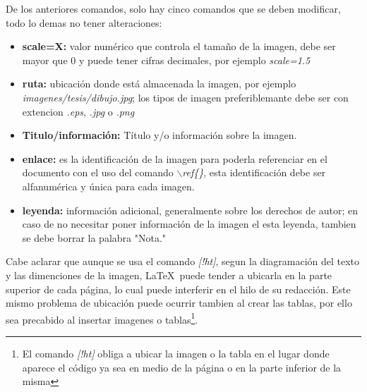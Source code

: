 De los anteriores comandos, solo hay cinco comandos que se deben modificar, todo lo demas no tener alteraciones:
\begin{itemize}
    \item \textbf{scale=X: } valor numérico que controla el tamaño de la imagen, debe ser mayor que 0 y puede tener cifras decimales, por ejemplo \emph{scale=1.5} 
    \item \textbf{ruta: } ubicación donde está almacenada la imagen, por ejemplo \emph{imagenes/tesis/dibujo.jpg}; los tipos de imagen preferiblemante debe ser con extencion \emph{.eps}, \emph{.jpg} o \emph{.png}
    \item \textbf{Titulo/información: } Título y/o información sobre la imagen.
    \item \textbf{enlace: } es la identificación de la imagen para poderla referenciar en el documento con el uso del comando $\backslash$\emph{ref\{\}}, esta identificación debe ser alfanumérica y única para cada imagen.
    \item \textbf{leyenda: } información adicional, generalmente sobre los derechos de autor; en caso de no necesitar poner información de la imagen el esta leyenda, tambien se debe borrar la palabra "Nota."
\end{itemize}

Cabe aclarar que aunque se usa el comando \emph{[!ht]}, segun la diagramación del texto y las dimenciones de la imagen, \LaTeX\ puede tender a ubicarla en la parte superior de cada página, lo cual puede interferir en el hilo de su redacción. Este mismo problema de ubicación puede ocurrir tambien al crear las tablas, por ello sea precabido al insertar imagenes o tablas\footnote{El comando \emph{[!ht]} obliga a ubicar la imagen o la tabla en el lugar donde aparece el código ya sea en medio de la página o en la parte inferior de la misma}.